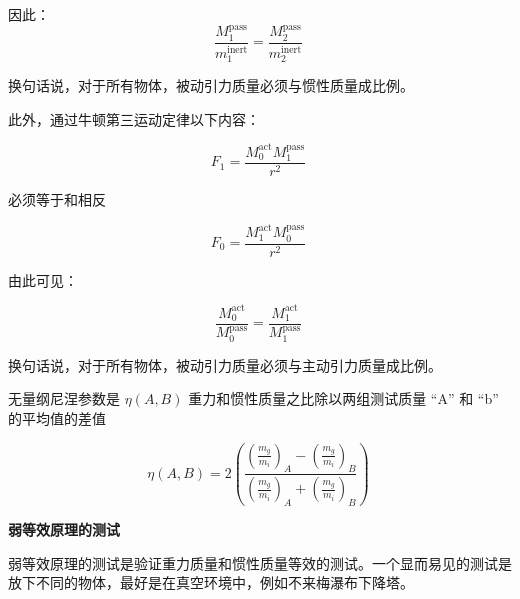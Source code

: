 因此：
\begin{equation}
\frac{M_1^{\text{pass}}}{m_1^{\text{inert}}} = \frac{M_2^{\text{pass}}}{m_2^{\text{inert}}}~
\end{equation}

换句话说，对于所有物体，被动引力质量必须与惯性质量成比例。

此外，通过牛顿第三运动定律以下内容：

\begin{equation}
F_1 = \frac{M_0^{\text{act}} M_1^{\text{pass}}}{r^2}~
\end{equation}

必须等于和相反

\begin{equation}
F_0 = \frac{M_1^{\text{act}} M_0^{\text{pass}}}{r^2}~
\end{equation}

由此可见：

\begin{equation}
\frac{M_0^{\text{act}}}{M_0^{\text{pass}}} = \frac{M_1^{\text{act}}}{M_1^{\text{pass}}}~
\end{equation}

换句话说，对于所有物体，被动引力质量必须与主动引力质量成比例。

无量纲尼涅参数是 $\eta(A, B)$ 重力和惯性质量之比除以两组测试质量 “A” 和 “b” 的平均值的差值

\begin{equation}
\eta(A, B) = 2 \left( \frac{\left(\frac{m_g}{m_i}\right)_A - \left(\frac{m_g}{m_i}\right)_B}{\left(\frac{m_g}{m_i}\right)_A + \left(\frac{m_g}{m_i}\right)_B} \right)~
\end{equation}

\textbf{弱等效原理的测试}

弱等效原理的测试是验证重力质量和惯性质量等效的测试。一个显而易见的测试是放下不同的物体，最好是在真空环境中，例如不来梅瀑布下降塔。

